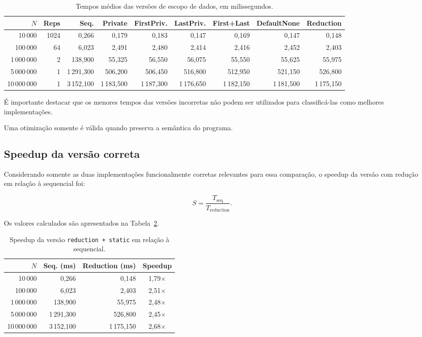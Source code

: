 \begin{table}[htbp]
\centering
\caption{Tempos médios das versões de escopo de dados, em milissegundos.}
\label{tab:atvd07-tempos-dados}
\scriptsize
\begin{tabular}{|r|r|r|r|r|r|r|r|r|}
\hline
\textbf{\(N\)} &
\textbf{Reps} &
\textbf{Seq.} &
\textbf{Private} &
\textbf{FirstPriv.} &
\textbf{LastPriv.} &
\textbf{First+Last} &
\textbf{DefaultNone} &
\textbf{Reduction} \\
\hline
10\,000
& 1024 & 0,266 & 0,179 & 0,183 & 0,147 & 0,169 & 0,147 & 0,148 \\
\hline
100\,000
& 64 & 6,023 & 2,491 & 2,480 & 2,414 & 2,416 & 2,452 & 2,403 \\
\hline
1\,000\,000
& 2 & 138,900 & 55,325 & 56,550 & 56,075 & 55,550 & 55,625 & 55,975 \\
\hline
5\,000\,000
& 1 & 1\,291,300 & 506,200 & 506,450 & 516,800 &
512,950 & 521,150 & 526,800 \\
\hline
10\,000\,000
& 1 & 3\,152,100 & 1\,183,500 & 1\,187,300 & 1\,176,650 &
1\,182,150 & 1\,181,500 & 1\,175,150 \\
\hline
\end{tabular}
\end{table}

É importante destacar que os menores tempos das versões incorretas não
podem ser utilizados para classificá-las como melhores implementações.

Uma otimização somente é válida quando preserva a semântica do programa.


\subsection{Speedup da versão correta}

Considerando somente as duas implementações funcionalmente corretas
relevantes para essa comparação, o speedup da versão com redução em relação
à sequencial foi:

\[
S =
\frac{T_{\mathrm{seq}}}
     {T_{\mathrm{reduction}}}.
\]

Os valores calculados são apresentados na
Tabela~\ref{tab:atvd07-speedup-reduction}.

\begin{table}[htbp]
\centering
\caption{Speedup da versão \texttt{reduction + static} em relação à sequencial.}
\label{tab:atvd07-speedup-reduction}
\begin{tabular}{|r|r|r|c|}
\hline
\textbf{\(N\)} &
\textbf{Seq. (ms)} &
\textbf{Reduction (ms)} &
\textbf{Speedup} \\
\hline
10\,000
& 0,266 & 0,148 & 1,79$\times$ \\
\hline
100\,000
& 6,023 & 2,403 & 2,51$\times$ \\
\hline
1\,000\,000
& 138,900 & 55,975 & 2,48$\times$ \\
\hline
5\,000\,000
& 1\,291,300 & 526,800 & 2,45$\times$ \\
\hline
10\,000\,000
& 3\,152,100 & 1\,175,150 & 2,68$\times$ \\
\hline
\end{tabular}
\end{table}

